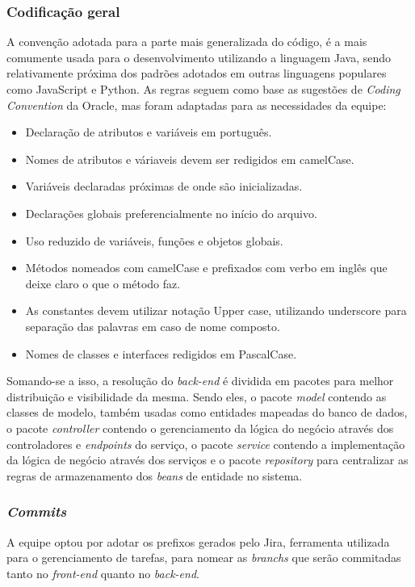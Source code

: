 \documentclass[
    12pt,               %
    openright,          %
    oneside,
    a4paper,            %
    BIBLATEX,           %
    TODO,               %
    english,            %
    brazil              %
    ]{ifsp-spo-inf-ctds}
\begin{document}
        \subsubsection{Codificação geral}
        A convenção adotada para a parte mais generalizada do código, é a mais comumente usada para o desenvolvimento utilizando a linguagem Java, sendo relativamente próxima dos padrões adotados em outras linguagens populares como JavaScript e Python. As regras seguem como base as sugestões de \emph{Coding Convention }da Oracle, mas foram adaptadas para as necessidades da equipe:

        \begin{itemize}
            \item
            Declaração de atributos e variáveis em português.
            \item
            Nomes de atributos e váriaveis devem ser redigidos em camelCase.
            \item
            Variáveis declaradas próximas de onde são inicializadas.
            \item
            Declarações globais preferencialmente no início do arquivo.
            \item
            Uso reduzido de variáveis, funções e objetos globais.
            \item
            Métodos nomeados com camelCase e prefixados com verbo em inglês que deixe claro o que o método faz.
            \item
            As constantes devem utilizar notação Upper case, utilizando underscore para separação das palavras em caso de nome composto.
            \item
            Nomes de classes e interfaces redigidos em PascalCase.
        \end{itemize}

    Somando-se a isso, a resolução do \emph{back-end} é dividida em pacotes para melhor distribuição e visibilidade da mesma. Sendo eles, o pacote \emph{model} contendo as classes de modelo, também usadas como entidades mapeadas do banco de dados, o pacote \emph{controller} contendo o gerenciamento da lógica do negócio através dos controladores e \emph{endpoints} do serviço, o pacote \emph{service} contendo a implementação da lógica de negócio através dos serviços e o pacote \emph{repository} para centralizar as regras de armazenamento dos \emph{beans} de entidade no sistema.
        
    \subsubsection{\emph{Commits}}
    A equipe optou por adotar os prefixos gerados pelo Jira, ferramenta utilizada para o gerenciamento de tarefas, para nomear as \emph{branchs} que serão commitadas tanto no \emph{front-end} quanto no \emph{back-end}.
\end{document}
